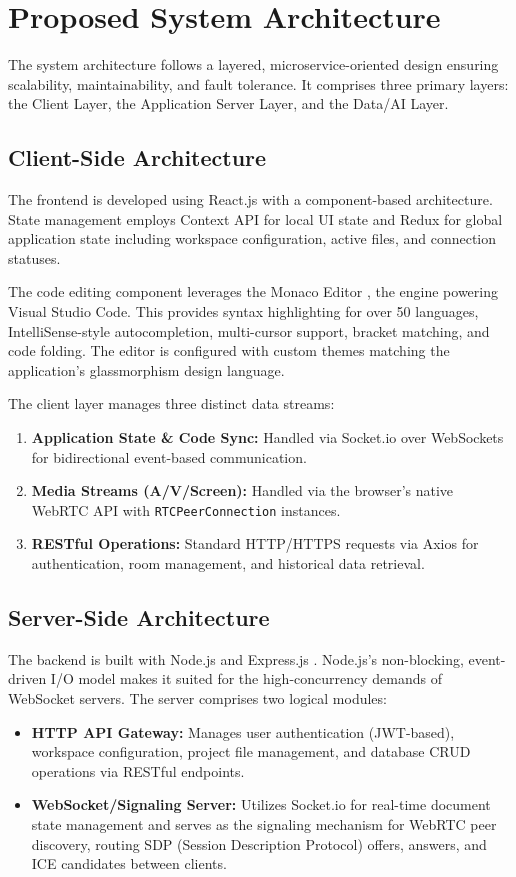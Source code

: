 \documentclass[conference]{IEEEtran}
\begin{document}
\section{Proposed System Architecture}
The system architecture follows a layered, microservice-oriented design ensuring scalability, maintainability, and fault tolerance. It comprises three primary layers: the Client Layer, the Application Server Layer, and the Data/AI Layer.

\subsection{Client-Side Architecture}
The frontend is developed using React.js \cite{b6} with a component-based architecture. State management employs Context API for local UI state and Redux for global application state including workspace configuration, active files, and connection statuses.

The code editing component leverages the Monaco Editor \cite{b7}, the engine powering Visual Studio Code. This provides syntax highlighting for over 50 languages, IntelliSense-style autocompletion, multi-cursor support, bracket matching, and code folding. The editor is configured with custom themes matching the application's glassmorphism design language.

The client layer manages three distinct data streams:
\begin{enumerate}
    \item \textbf{Application State \& Code Sync:} Handled via Socket.io \cite{b4} over WebSockets for bidirectional event-based communication.
    \item \textbf{Media Streams (A/V/Screen):} Handled via the browser's native WebRTC API with \texttt{RTCPeerConnection} instances.
    \item \textbf{RESTful Operations:} Standard HTTP/HTTPS requests via Axios for authentication, room management, and historical data retrieval.
\end{enumerate}

\subsection{Server-Side Architecture}
The backend is built with Node.js and Express.js \cite{b5}. Node.js's non-blocking, event-driven I/O model makes it suited for the high-concurrency demands of WebSocket servers. The server comprises two logical modules:
\begin{itemize}
    \item \textbf{HTTP API Gateway:} Manages user authentication (JWT-based), workspace configuration, project file management, and database CRUD operations via RESTful endpoints.
    \item \textbf{WebSocket/Signaling Server:} Utilizes Socket.io for real-time document state management and serves as the signaling mechanism for WebRTC peer discovery, routing SDP (Session Description Protocol) offers, answers, and ICE candidates between clients.
\end{itemize}
\end{document}
